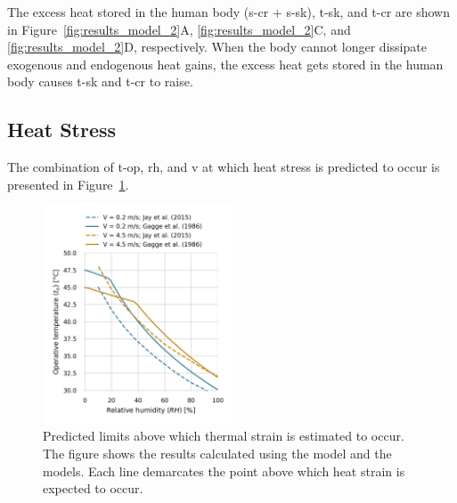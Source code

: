 The excess heat stored in the human body (\acs{s-cr} + \acs{s-sk}), \ac{t-sk}, and \ac{t-cr} are shown in Figure~\ref{fig:results_model_2}A, \ref{fig:results_model_2}C, and \ref{fig:results_model_2}D, respectively.
When the body cannot longer dissipate exogenous and endogenous heat gains, the excess heat gets stored in the human body causes \ac{t-sk} and \ac{t-cr} to raise.

\subsection{Heat Stress}\label{subsec:heat-stress}

The combination of \ac{t-op}, \ac{rh}, and \ac{v} at which heat stress is predicted to occur is presented in Figure~\ref{fig:comparison_air_speed}.

\begin{figure}[thb!]
    \centering
    \includegraphics[width=0.5\textwidth]{figures/comparison_air_speed}
    \caption{Predicted limits above which thermal strain is estimated to occur.
    The figure shows the results calculated using the  model and the  models.
    Each line demarcates the point above which heat strain is expected to occur.}
    \label{fig:comparison_air_speed}
\end{figure}

